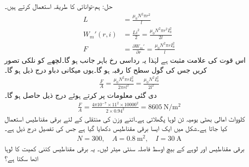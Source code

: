 حل:\quad 
ہم-توانائی کا طریقہ استعمال کرتے ہیں۔
\begin{align*}
L&=\frac{\mu_0 N^2 \pi r^2}{l}\\
W_m'(r,i)&=\frac{L i^2}{2}=\frac{\mu_0 N^2 \pi r^2 I_0^2}{2 l}\\
F&=\frac{\partial W_m'}{\partial r}=\frac{\mu_0 N^2 \pi r I_0^2}{l}
\end{align*}
اس قوت کی علامت  مثبت ہے لہٰذا یہ رداسی رخ  باہر جانب ہو گا۔لچھے کو نلکی تصور کریں جس کی گول سطح  کا رقبہ  ہو گا۔یوں میکانی دباو درج ذیل ہو گا۔
\begin{align*}
\frac{F}{A}=\frac{\mu_0 N^2 \pi r I_0^2}{2\pi r l^2}=\frac{\mu_0 N^2  I_0^2}{2 l^2}
\end{align*}
دی گئی معلومات پر کرتے ہوئے درج ذیل  حاصل ہو گا۔
\begin{align*}
\frac{F}{A}=\frac{4\pi 10^{-7} \times 11^2 \times \num{10000}^2 }{2 \times 0.94^2}=\SI{8605}{\newton \per \meter \squared}
\end{align*}
%
   کلوواٹ امالی بھٹی یومیہ  ٹن لوہا  پگھلاتی ہے۔اتنے وزن کی منتقلی کے لئے برقی مقناطیس استعمال کیا جاتا ہے۔شکل  میں ایک ایسا  برقی مقناطیس دکھایا گیا ہے جس کی تفصیل درج ذیل ہے۔
\begin{align*}
N=300, \quad A=\SI{0.8}{\meter \squared}, \quad I=\SI{30}{\ampere}
\end{align*}
برقی مقناطیس اور لوہے کے بیچ اوسط فاصلہ  سنٹی میٹر لیں۔ یہ برقی مقناطیس کتنی کمیت کا لوہا اٹھا سکتا ہے؟
